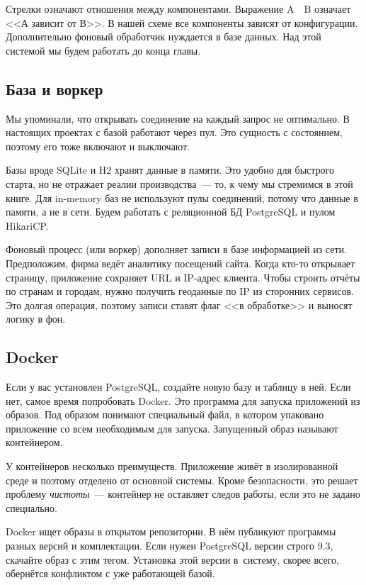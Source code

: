 Стрелки означают отношения между компонентами. Выражение A~\arr~B означает
<<А зависит от В>>. В нашей схеме все компоненты зависят от конфигурации.
Дополнительно фоновый обработчик нуждается в базе данных. Над этой
системой мы будем работать до конца главы.

\subsection{База и воркер}

Мы упоминали, что открывать соединение на каждый запрос не оптимально. В
настоящих проектах с базой работают через пул. Это сущность с состоянием,
поэтому его тоже включают и выключают.


Базы вроде SQLite и H2 хранят данные в памяти. Это удобно для быстрого старта,
но не отражает реалии производства~--- то, к чему мы стремимся в этой книге. Для
in-memory баз не используют пулы соединений, потому что данные в памяти, а не в
сети. Будем работать с реляционной БД PostgreSQL и пулом HikariCP.

Фоновый процесс (или воркер) дополняет записи в базе информацией из
сети. Предположим, фирма ведёт аналитику посещений сайта. Когда кто-то открывает
страницу, приложение сохраняет URL и IP-адрес клиента. Чтобы строить отчёты по
странам и городам, нужно получить геоданные по IP из сторонних сервисов. Это
долгая операция, поэтому записи ставят флаг <<в обработке>> и выносят логику
в фон.

\subsection{Docker}


\label{docker-db}

Если у вас установлен PostgreSQL, создайте новую базу и таблицу в ней. Если нет,
самое время попробовать Docker. Это программа для запуска приложений из
образов. Под образом понимают специальный файл, в котором упаковано приложение
со всем необходимым для запуска. Запущенный образ называют контейнером.

У контейнеров несколько преимуществ. Приложение живёт в изолированной среде и
поэтому отделено от основной системы. Кроме безопасности, это решает проблему
\emph{чистоты}~--- контейнер не оставляет следов работы, если это не задано
специально.

Docker ищет образы в открытом репозитории. В нём публикуют программы разных
версий и комплектации. Если нужен PostgreSQL версии строго 9.3, скачайте образ с
этим тегом. Установка этой версии в~систему, скорее всего, обернётся конфликтом
с уже работающей базой.

